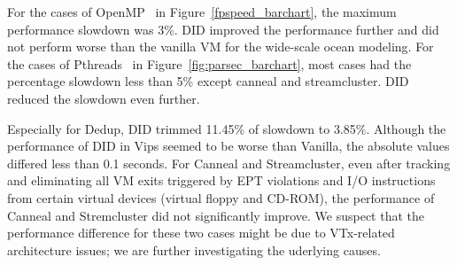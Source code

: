 For the cases of OpenMP~\cite{dagum:1998} in
Figure~\ref{fpspeed_barchart}, the maximum performance
slowdown was 3\%. DID improved the performance further and did
not perform worse than the vanilla VM for the wide-scale ocean
modeling. For the cases of Pthreads~\cite{lewis:1998} in
Figure~\ref{fig:parsec_barchart}, most cases had the
percentage slowdown less than 5\% except canneal and
streamcluster. DID reduced the slowdown even further.

Especially for Dedup, DID trimmed 11.45\% of slowdown to
3.85\%. Although the performance of DID in Vips seemed to be
worse than Vanilla, the absolute values
differed less than 0.1 seconds.
For Canneal and Streamcluster,
even after tracking and eliminating all VM exits triggered by EPT violations
and I/O instructions from certain virtual devices
(virtual floppy and CD-ROM), the performance of 
Canneal and Stremcluster did not significantly improve.
We suspect that the performance difference for these two cases 
might be due to VTx-related architecture issues; we are
further investigating the uderlying causes.

